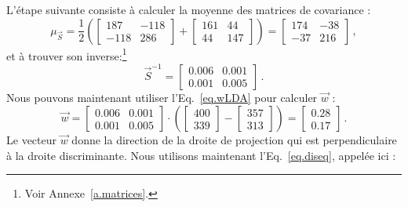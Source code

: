 L'étape suivante consiste à calculer la moyenne des matrices de covariance :
\[
\mu_{\vec{S}} = 
\frac{1}{2}\left(\left[ \begin{array}{c} 187\\-118\end{array} \begin{array}{c} -118\\286 \end{array}\right]+
\left[ \begin{array}{c} 161\\44\end{array} \begin{array}{c} 44\\147 \end{array}\right]\right) = 
\left[ \begin{array}{c} 174\\-37\end{array} \begin{array}{c} -38\\216 \end{array}\right]\,,
\]
et à trouver son inverse:\footnote{Voir Annexe~\ref{a.matrices}.}
\[
\vec{S}^{-1} = \left[ \begin{array}{c} 0.006\\0.001\end{array} \begin{array}{c} 0.001\\0.005 \end{array}\right]\,.
\]
Nous pouvons maintenant utiliser l'Eq.~\ref{eq.wLDA} pour calculer $\vec{w}$ :
\[
\vec{w} = \left[ \begin{array}{c} 0.006\\0.001\end{array} \begin{array}{c} 0.001\\0.005 \end{array}\right] \cdot \left( \left[ \begin{array}{c} 400\\339 \end{array}\right] - \left[ \begin{array}{c} 357\\313 \end{array} \right] \right) = \left[ \begin{array}{c} 0.28\\0.17 \end{array} \right]\,.
\]
Le vecteur $\vec{w}$ donne la direction de la droite de projection qui est perpendiculaire à la droite discriminante. Nous utilisons maintenant l'Eq.~\ref{eq.diseq}, appelée ici :
